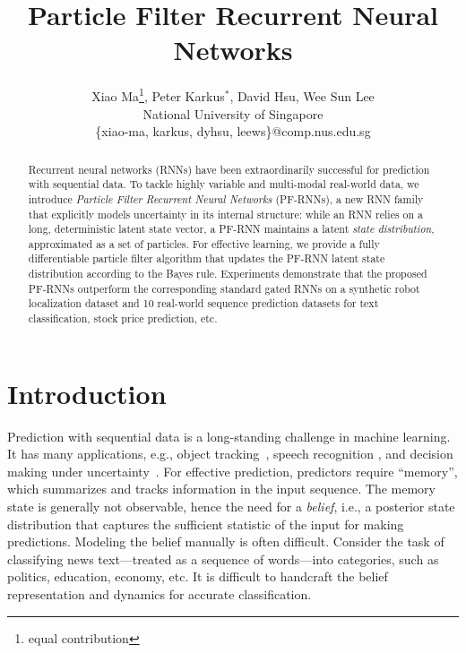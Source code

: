 \documentclass[letterpaper]{article} %
\title{Particle Filter Recurrent Neural Networks}
\author{Xiao Ma\thanks{equal contribution}, Peter Karkus$^*$, David Hsu, Wee Sun Lee\\
National University of Singapore\\
\{xiao-ma, karkus, dyhsu, leews\}@comp.nus.edu.sg}
\begin{document}
\maketitle

\begin{abstract}
	Recurrent neural networks (RNNs) have been extraordinarily successful for prediction with sequential data.  To tackle highly variable and multi-modal real-world data, we introduce  \textit{Particle Filter Recurrent Neural Networks} (PF-RNNs), a new RNN family that  explicitly models uncertainty in its internal structure: while an  RNN relies on a  long, deterministic latent state vector, a PF-RNN maintains a latent \textit{state distribution}, approximated as a set of particles. For effective learning, we provide a fully differentiable particle filter algorithm that updates the PF-RNN latent state distribution according to the Bayes rule.  Experiments  demonstrate that the proposed PF-RNNs outperform the corresponding standard gated RNNs on a synthetic robot localization dataset and 10 real-world sequence prediction datasets for text classification, stock price prediction, etc. %
	
\end{abstract}

\section{Introduction}

Prediction with sequential data is a long-standing challenge in machine learning. It has many applications, e.g.,  object tracking~\cite{blake1997condensation},
speech recognition \cite{xiong2018microsoft},
and decision making under uncertainty~\cite{somani2013despot}. For effective prediction, predictors require ``memory'', which summarizes and tracks information in the input sequence. The memory state is generally not observable, hence the need for a \emph{belief}, {i.e.}, a posterior state distribution that captures the sufficient statistic of the input for making predictions.  Modeling the belief manually is often difficult. Consider the task of classifying news text---treated as a sequence of words---into categories, such as politics, education, economy, etc. %
It is difficult to handcraft the belief representation and dynamics for accurate classification.
\end{document}
